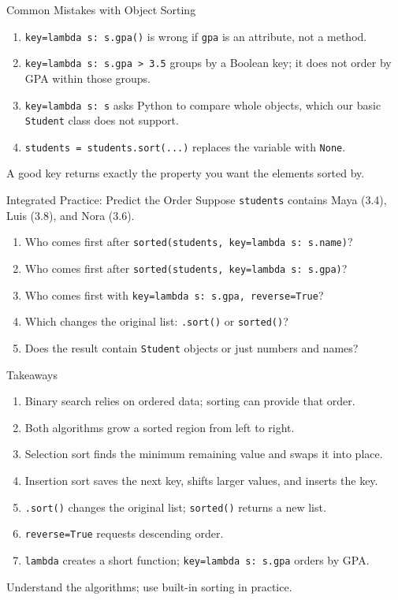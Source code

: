 \documentclass[aspectratio=169,10pt]{beamer}
\begin{document}
\begin{frame}{Common Mistakes with Object Sorting}
\small
\begin{enumerate}
 \item \texttt{key=lambda s: s.gpa()} is wrong if \texttt{gpa} is an attribute, not a method.
 \item \texttt{key=lambda s: s.gpa > 3.5} groups by a Boolean key; it does not order by GPA within those groups.
 \item \texttt{key=lambda s: s} asks Python to compare whole objects, which our basic \texttt{Student} class does not support.
 \item \texttt{students = students.sort(...)} replaces the variable with \texttt{None}.
\end{enumerate}
\begin{keyidea}A good key returns exactly the property you want the elements sorted by.\end{keyidea}
\end{frame}

\begin{frame}{Integrated Practice: Predict the Order}
\small
Suppose \texttt{students} contains Maya (3.4), Luis (3.8), and Nora (3.6).
\begin{enumerate}
 \item Who comes first after \texttt{sorted(students, key=lambda s: s.name)}?
 \item Who comes first after \texttt{sorted(students, key=lambda s: s.gpa)}?
 \item Who comes first with \texttt{key=lambda s: s.gpa, reverse=True}?
 \item Which changes the original list: \texttt{.sort()} or \texttt{sorted()}?
 \item Does the result contain \texttt{Student} objects or just numbers and names?
\end{enumerate}
\end{frame}

\begin{frame}{Takeaways}
\small
\begin{enumerate}
 \item Binary search relies on ordered data; sorting can provide that order.
 \item Both algorithms grow a sorted region from left to right.
 \item Selection sort finds the minimum remaining value and swaps it into place.
 \item Insertion sort saves the next key, shifts larger values, and inserts the key.
 \item \texttt{.sort()} changes the original list; \texttt{sorted()} returns a new list.
 \item \texttt{reverse=True} requests descending order.
 \item \texttt{lambda} creates a short function; \texttt{key=lambda s: s.gpa} orders by GPA.
\end{enumerate}
\begin{keyidea}Understand the algorithms; use built-in sorting in practice.\end{keyidea}
\end{frame}
\end{document}
